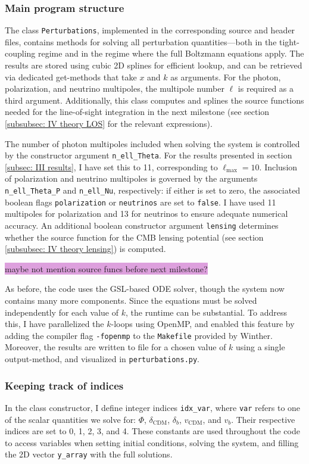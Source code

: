 \documentclass{aa}
\numberwithin{equation}{section}
\numberwithin{table}{section}
\numberwithin{figure}{section}
\begin{document}
\subsubsection{Main program structure}\label{subsubsec: III methods program}
The class \verb|Perturbations|, implemented in the corresponding source and header files, contains methods for solving all perturbation quantities—both in the tight-coupling regime and in the regime where the full Boltzmann equations apply. The results are stored using cubic 2D splines for efficient lookup, and can be retrieved via dedicated get-methods that take $x$ and $k$ as arguments. For the photon, polarization, and neutrino multipoles, the multipole number $\ell$ is required as a third argument. Additionally, this class computes and splines the source functions needed for the line-of-sight integration in the next milestone (see section \ref{subsubsec: IV theory LOS} for the relevant expressions).

The number of photon multipoles included when solving the system is controlled by the constructor argument \verb|n_ell_Theta|. For the results presented in section \ref{subsec: III results}, I have set this to 11, corresponding to $\ell_{\max} = 10$. Inclusion of polarization and neutrino multipoles is governed by the arguments \verb|n_ell_Theta_P| and \verb|n_ell_Nu|, respectively: if either is set to zero, the associated boolean flags \verb|polarization| or \verb|neutrinos| are set to \verb|false|. I have used 11 multipoles for polarization and 13 for neutrinos to ensure adequate numerical accuracy. An additional boolean constructor argument \verb|lensing| determines whether the source function for the CMB lensing potential (see section \ref{subsubsec: IV theory lensing}) is computed.

\colorbox{Plum}{maybe not mention source funcs before next milestone?}

As before, the code uses the GSL-based ODE solver, though the system now contains many more components. Since the equations must be solved independently for each value of $k$, the runtime can be substantial. To address this, I have parallelized the $k$-loops using OpenMP, and enabled this feature by adding the compiler flag \verb|-fopenmp| to the \verb|Makefile| provided by Winther. Moreover, the results are written to file for a chosen value of $k$ using a single output-method, and visualized in \verb|perturbations.py|. 


\subsubsection{Keeping track of indices}  
In the class constructor, I define integer indices \verb|idx_var|, where \verb|var| refers to one of the scalar quantities we solve for: $\Phi$, $\delta_\text{CDM}$, $\delta_b$, $v_\text{CDM}$, and $v_b$. Their respective indices are set to 0, 1, 2, 3, and 4. These constants are used throughout the code to access variables when setting initial conditions, solving the system, and filling the 2D vector \verb|y_array| with the full solutions.
\end{document}

